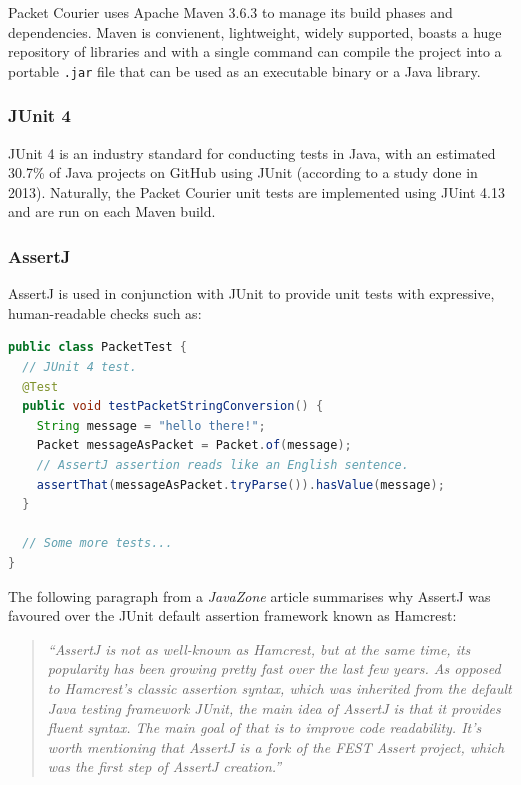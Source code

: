 Packet Courier uses Apache Maven 3.6.3\cite{maven} to manage its build phases and dependencies. Maven is convienent,
lightweight, widely supported, boasts a huge repository of libraries\cite{maven_repository} and with a single
command can compile the project into a portable \texttt{.jar} file that can be used as an executable binary or a Java
library.

\subsubsection{JUnit 4}

JUnit 4\cite{juint4} is an industry standard for conducting tests in Java, with an estimated 30.7\% of Java projects on
GitHub using JUnit (according to a study done in 2013)\cite{java_library_popularity}. Naturally, the Packet Courier
unit tests are implemented using JUint 4.13 and are run on each Maven build.

\subsubsection{AssertJ}

AssertJ\cite{assert_j} is used in conjunction with JUnit to provide unit tests with expressive, human-readable checks
such as:

\begin{lstlisting}[language=Java]
public class PacketTest {
  // JUnit 4 test.
  @Test
  public void testPacketStringConversion() {
    String message = "hello there!";
    Packet messageAsPacket = Packet.of(message);
    // AssertJ assertion reads like an English sentence.
    assertThat(messageAsPacket.tryParse()).hasValue(message);
  }

  // Some more tests...
}
\end{lstlisting}

The following paragraph from a \emph{JavaZone} article summarises why AssertJ was favoured over the JUnit default
assertion framework known as Hamcrest\cite{assert_j_vs_hamcrest}:
\begin{quote}
    \emph{``AssertJ is not as well-known as Hamcrest, but at the same time, its popularity has been growing pretty
    fast over the last few years. As opposed to Hamcrest’s classic assertion syntax, which was inherited from the
    default Java testing framework JUnit, the main idea of AssertJ is that it provides fluent syntax. The main goal
    of that is to improve code readability. It’s worth mentioning that AssertJ is a fork of the FEST Assert project,
        which was the first step of AssertJ creation.''}
\end{quote}

